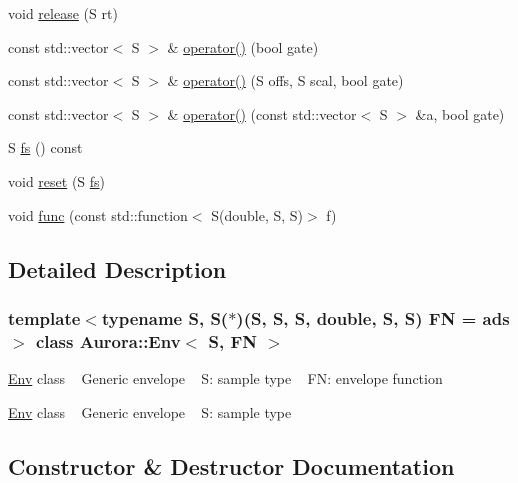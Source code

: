\begin{DoxyCompactItemize}
\item 
void \hyperlink{class_aurora_1_1_env_a2e52ca727b587d89e13a6c3832786f22}{release} (S rt)
\item 
const std\+::vector$<$ S $>$ \& \hyperlink{class_aurora_1_1_env_ae4e2dec694f0be0f0efa5b073a06fef5}{operator()} (bool gate)
\item 
const std\+::vector$<$ S $>$ \& \hyperlink{class_aurora_1_1_env_a664e3c6ce7e66de66305ab220c116792}{operator()} (S offs, S scal, bool gate)
\item 
const std\+::vector$<$ S $>$ \& \hyperlink{class_aurora_1_1_env_a577d95d24fd9f5c5796210874623c650}{operator()} (const std\+::vector$<$ S $>$ \&a, bool gate)
\item 
S \hyperlink{class_aurora_1_1_env_a8b83ca686cce4fc31b03b1de847bc062}{fs} () const
\item 
void \hyperlink{class_aurora_1_1_env_a12db5d285b749a7e1fed988d344d3bc9}{reset} (S \hyperlink{class_aurora_1_1_env_a8b83ca686cce4fc31b03b1de847bc062}{fs})
\item 
void \hyperlink{class_aurora_1_1_env_a92aec91bb78127cf50d5d841870cce14}{func} (const std\+::function$<$ S(double, S, S)$>$ f)
\end{DoxyCompactItemize}


\subsection{Detailed Description}
\subsubsection*{template$<$typename S, S($\ast$)(\+S, S, S, double, S, S) FN = ads$>$\newline
class Aurora\+::\+Env$<$ S, F\+N $>$}

\hyperlink{class_aurora_1_1_env}{Env} class ~\newline
Generic envelope ~\newline
S\+: sample type ~\newline
FN\+: envelope function

\hyperlink{class_aurora_1_1_env}{Env} class ~\newline
Generic envelope ~\newline
S\+: sample type 

\subsection{Constructor \& Destructor Documentation}
\mbox{\label{class_aurora_1_1_env_a500fe7e05d736a21c801ffa480aceed7}} 

